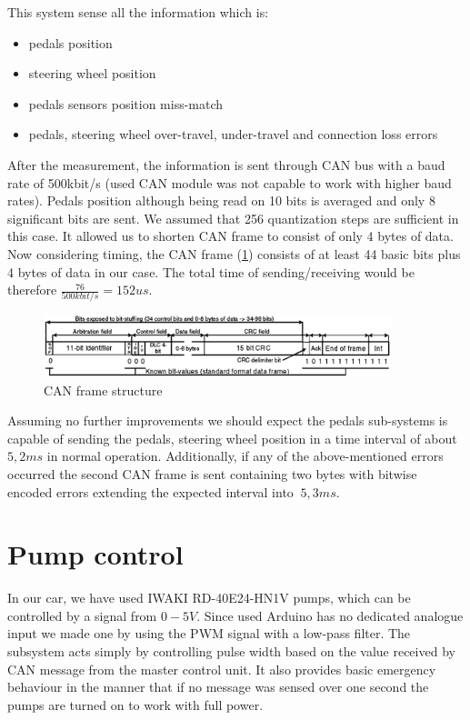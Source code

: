 This system sense all the information which is:
\begin{itemize}
    \item pedals position
    \item steering wheel position
    \item pedals sensors position miss-match
    \item pedals, steering wheel over-travel, under-travel and connection loss errors
\end{itemize}

After the measurement, the information is sent through CAN bus with a baud rate of 500kbit/s (used CAN module was not capable to work with higher baud rates). Pedals position although being read on 10 bits is averaged and only 8 significant bits are sent. We assumed that 256 quantization steps are sufficient in this case. It allowed us to shorten CAN frame to consist of only 4 bytes of data.
Now considering timing, the CAN frame (\ref{fig:CAN_FRAME}) consists of at least 44 basic bits plus 4 bytes of data in our case. The total time of sending/receiving would be therefore $\frac{76}{500kbit/s} = 152us$.

\begin{figure}[H]
    \centering
    \includegraphics[width=0.9\textwidth]{figures/CAN_FRAME.png}
    \caption{CAN frame structure \cite{CAN_stuffing}}
    \label{fig:CAN_FRAME}
\end{figure}

Assuming no further improvements we should expect the pedals sub-systems is capable of sending the pedals, steering wheel position in a time interval of about $5,2ms$\label{pedal_ideal_time} in normal operation.
Additionally, if any of the above-mentioned errors occurred the second CAN frame is sent containing two bytes with bitwise encoded errors extending the expected interval into $~5,3ms$.

\section{Pump control}\label{pump_control}
In our car, we have used IWAKI RD-40E24-HN1V pumps, which can be controlled by a signal from $0-5V$. Since used Arduino has no dedicated analogue input we made one by using the PWM signal with a low-pass filter.%
The subsystem acts simply by controlling pulse width based on the value received by CAN message from the master control unit. It also provides basic emergency behaviour in the manner that if no message was sensed over one second the pumps are turned on to work with full power.

